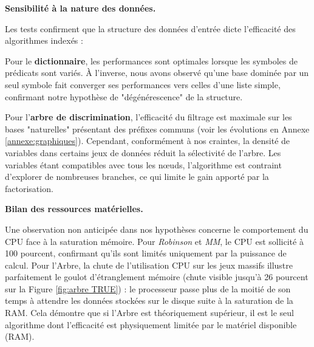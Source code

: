 \documentclass[11pt]{article}
\newenvironment{paraph}[1]{%
  \medskip
  \noindent\textbf{#1.}\quad

  \vspace{0.2cm}
}{%
  \medskip
}
\begin{document}
\begin{paraph}{Sensibilité à la nature des données}
    Les tests confirment que la structure des données d'entrée dicte l'efficacité des algorithmes indexés :

    \vspace{0.2cm}
    Pour le \textbf{dictionnaire}, les performances sont optimales lorsque les symboles de prédicats sont variés. À l'inverse, nous avons observé qu'une base dominée par un seul symbole fait converger ses performances vers celles d'une liste simple, confirmant notre hypothèse de "dégénérescence" de la structure.

    \vspace{0.2cm}
    Pour l'\textbf{arbre de discrimination}, l'efficacité du filtrage est maximale sur les bases "naturelles" présentant des préfixes communs (voir les évolutions en Annexe \ref{annexe:graphiques}). Cependant, conformément à nos craintes, la densité de variables dans certains jeux de données réduit la sélectivité de l'arbre. Les variables étant compatibles avec tous les nœuds, l'algorithme est contraint d'explorer de nombreuses branches, ce qui limite le gain apporté par la factorisation.
\end{paraph}

\begin{paraph}{Bilan des ressources matérielles}
    Une observation non anticipée dans nos hypothèses concerne le comportement du CPU face à la saturation mémoire. Pour \textit{Robinson} et \textit{MM}, le CPU est sollicité à 100 pourcent, confirmant qu'ils sont limités uniquement par la puissance de calcul. 
    Pour l'Arbre, la chute de l'utilisation CPU sur les jeux massifs illustre parfaitement le goulot d'étranglement mémoire (chute visible jusqu'à 26 pourcent sur la Figure \ref{fig:arbre TRUE}) : le processeur passe plus de la moitié de son temps à attendre les données stockées sur le disque suite à la saturation de la RAM. Cela démontre que si l'Arbre est théoriquement supérieur, il est le seul algorithme dont l'efficacité est physiquement limitée par le matériel disponible (RAM).
\end{paraph}
\end{document}
